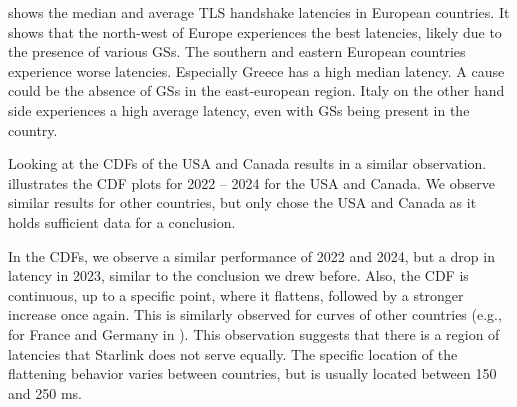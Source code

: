  shows the median and average TLS handshake
latencies in European countries. It shows that the north-west of Europe
experiences the best latencies, likely due to the presence of various \ac{GS}s.
The southern and eastern European countries experience worse latencies.
Especially Greece has a high median latency. A cause could be the absence of
\ac{GS}s in the east-european region. Italy on the other hand side experiences
a high average latency, even with \ac{GS}s being present in the country.

Looking at the CDFs of the USA and Canada results in a similar observation.
 illustrates the CDF plots for 2022 -- 2024 for the
USA and Canada. We observe similar results for other countries, but only chose
the USA and Canada as it holds sufficient data for a conclusion.

In the CDFs, we observe a similar performance of 2022 and 2024, but a drop in
latency in 2023, similar to the conclusion we drew before. Also, the CDF is
continuous, up to a specific point, where it flattens, followed by a stronger
increase once again. This is similarly observed for curves of other countries
(e.g., for France and Germany in ). This observation
suggests that there is a region of latencies that Starlink does not serve
equally. The specific location of the flattening behavior varies between
countries, but is usually located between 150 and 250 ms.


